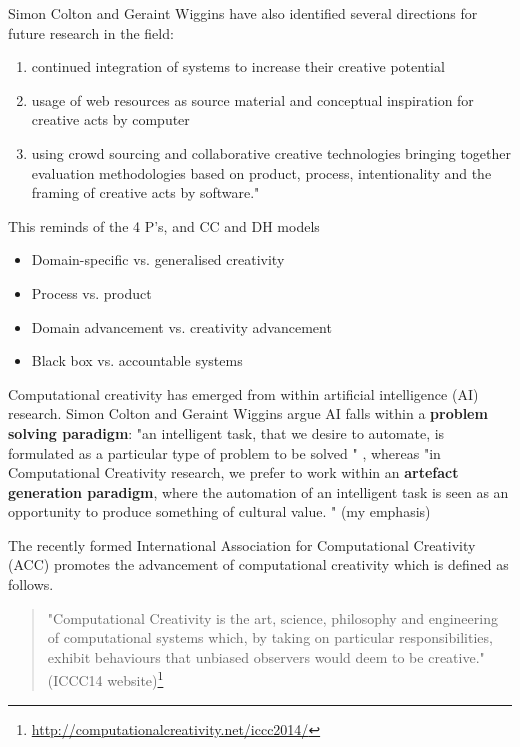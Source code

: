 Simon Colton and Geraint Wiggins have also identified several directions for future research in the field: \citep[p.5]{Colton2012}

\begin{enumerate}
  \item continued integration of systems to increase their creative potential
  \item usage of web resources as source material and conceptual inspiration for creative acts by computer
  \item using crowd sourcing and collaborative creative technologies bringing together evaluation methodologies based on product, process, intentionality and the framing of creative acts by software." \citep[p.5]{Colton2012}
\end{enumerate}

\begin{draft}
  This reminds of the 4 P’s, and CC and DH models
\end{draft}

\begin{shaded}
  \begin{itemize}
  \item Domain-specific vs. generalised creativity
  \item Process vs. product
  \item Domain advancement vs. creativity advancement
  \item Black box vs. accountable systems
  \end{itemize}
\end{shaded}

Computational creativity has emerged from within artificial intelligence (AI) research. Simon Colton and Geraint Wiggins argue AI falls within a \textbf{problem solving paradigm}: "an intelligent task, that we desire to automate, is formulated as a particular type of problem to be solved " \citep[p.2]{Colton2012},  whereas "in Computational Creativity research, we prefer to work within an \textbf{artefact generation paradigm}, where the automation of an intelligent task is seen as an opportunity to produce something of cultural value. " \citep[p.2]{Colton2012}(my emphasis)

The recently formed International Association for Computational Creativity (ACC)  promotes the advancement of computational creativity which is defined as follows.

\begin{quote}
  "Computational Creativity is the art, science, philosophy and engineering of computational systems which, by taking on particular responsibilities, exhibit behaviours that unbiased observers would deem to be creative." (ICCC14 website)\footnote{\url{http://computationalcreativity.net/iccc2014/}}
\end{quote}

